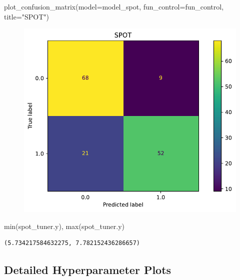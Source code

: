 \documentclass[
  letterpaper,
  DIV=11,
  numbers=noendperiod]{scrreprt}
\newenvironment{Shaded}{\begin{snugshade}}{\end{snugshade}}
\newcommand{\BuiltInTok}[1]{\textcolor[rgb]{0.00,0.23,0.31}{#1}}
\newcommand{\NormalTok}[1]{\textcolor[rgb]{0.00,0.23,0.31}{#1}}
\newcommand{\OperatorTok}[1]{\textcolor[rgb]{0.37,0.37,0.37}{#1}}
\newcommand{\StringTok}[1]{\textcolor[rgb]{0.13,0.47,0.30}{#1}}
\begin{document}
\begin{Shaded}
\begin{Highlighting}[]
\NormalTok{plot\_confusion\_matrix(model}\OperatorTok{=}\NormalTok{model\_spot, fun\_control}\OperatorTok{=}\NormalTok{fun\_control, title}\OperatorTok{=}\StringTok{"SPOT"}\NormalTok{)}
\end{Highlighting}
\end{Shaded}

\begin{figure}[H]

{\centering \includegraphics{017_spot_hpt_sklearn_classification_files/figure-pdf/cell-32-output-1.pdf}

}

\end{figure}

\begin{Shaded}
\begin{Highlighting}[]
\BuiltInTok{min}\NormalTok{(spot\_tuner.y), }\BuiltInTok{max}\NormalTok{(spot\_tuner.y)}
\end{Highlighting}
\end{Shaded}

\begin{verbatim}
(5.734217584632275, 7.782152436286657)
\end{verbatim}

\hypertarget{detailed-hyperparameter-plots}{%
\subsection{Detailed Hyperparameter
Plots}\label{detailed-hyperparameter-plots}}
\end{document}
